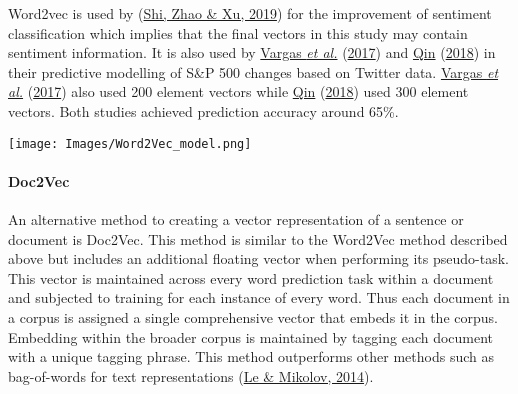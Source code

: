 \documentclass[11pt,preprint, authoryear]{elsarticle}
\let\origfigure\figure
\let\endorigfigure\endfigure
\renewenvironment{figure}[1][2] {
    \expandafter\origfigure\expandafter[H]
} {
    \endorigfigure
}
\numberwithin{equation}{section}
\numberwithin{figure}{section}
\numberwithin{table}{section}
\begin{document}
Word2vec is used by (\protect\hyperlink{ref-shi2019word2vec}{Shi, Zhao
\& Xu, 2019}) for the improvement of sentiment classification which
implies that the final vectors in this study may contain sentiment
information. It is also used by
\protect\hyperlink{ref-vargas2017deep}{Vargas \emph{et al.}}
(\protect\hyperlink{ref-vargas2017deep}{2017}) and
\protect\hyperlink{ref-qin230natural}{Qin}
(\protect\hyperlink{ref-qin230natural}{2018}) in their predictive
modelling of S\&P 500 changes based on Twitter data.
\protect\hyperlink{ref-vargas2017deep}{Vargas \emph{et al.}}
(\protect\hyperlink{ref-vargas2017deep}{2017}) also used 200 element
vectors while \protect\hyperlink{ref-qin230natural}{Qin}
(\protect\hyperlink{ref-qin230natural}{2018}) used 300 element vectors.
Both studies achieved prediction accuracy around 65\%.

\begin{figure}
\centering
\texttt{[image: Images/Word2Vec\_model.png]}
\caption{Word2Vec model}
\end{figure}

\hypertarget{doc2vec}{%
\paragraph{\texorpdfstring{Doc2Vec
\label{Doc2Vec}}{Doc2Vec }}\label{doc2vec}}

An alternative method to creating a vector representation of a sentence
or document is Doc2Vec. This method is similar to the Word2Vec method
described above but includes an additional floating vector when
performing its pseudo-task. This vector is maintained across every word
prediction task within a document and subjected to training for each
instance of every word. Thus each document in a corpus is assigned a
single comprehensive vector that embeds it in the corpus. Embedding
within the broader corpus is maintained by tagging each document with a
unique tagging phrase. This method outperforms other methods such as
bag-of-words for text representations
(\protect\hyperlink{ref-le2014distributed}{Le \& Mikolov, 2014}).
\end{document}
